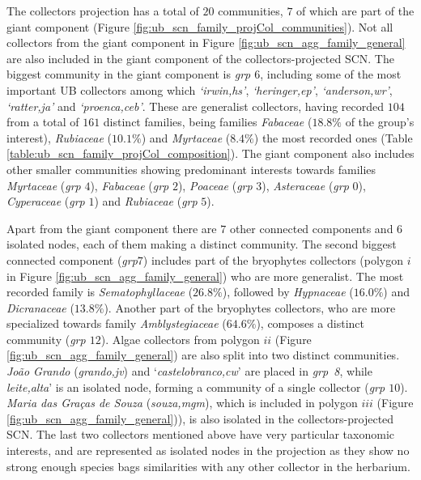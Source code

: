 The collectors projection has a total of $20$ communities, $7$ of which are part of the giant component (Figure \ref{fig:ub_scn_family_projCol_communities}). 
Not all collectors from the giant component in Figure \ref{fig:ub_scn_agg_family_general} are also included in the giant component of the collectors-projected SCN.
The biggest community in the giant component is \textit{grp $6$}, including some of the most important UB collectors among which \textit{`irwin,hs'}, \textit{`heringer,ep'}, \textit{`anderson,wr'}, \textit{`ratter,ja'} and \textit{`proenca,ceb'}.
These are generalist collectors, having recorded $104$ from a total of $161$ distinct families, being families \textit{Fabaceae} ($18.8\%$ of the group's interest), \textit{Rubiaceae} ($10.1\%$) and \textit{Myrtaceae} ($8.4\%$) the most recorded ones (Table \ref{table:ub_scn_family_projCol_composition}). 
%
The giant component also includes other smaller communities showing predominant interests towards families \textit{Myrtaceae} (\textit{grp} $4$), \textit{Fabaceae} (\textit{grp} $2$), \textit{Poaceae} (\textit{grp} $3$), \textit{Asteraceae} (\textit{grp} $0$), \textit{Cyperaceae} (\textit{grp} $1$) and \textit{Rubiaceae} (\textit{grp} $5$).

Apart from the giant component there are $7$ other connected components and $6$ isolated nodes, each of them making a distinct community.
The second biggest connected component (\textit{grp{$7$}}) includes part of the bryophytes collectors (polygon $i$ in Figure \ref{fig:ub_scn_agg_family_general}) who are more generalist.
The most recorded family is \textit{Sematophyllaceae} ($26.8\%$), followed by \textit{Hypnaceae} ($16.0\%$) and \textit{Dicranaceae} ($13.8\%$). 
Another part of the bryophytes collectors, who are more specialized towards family \textit{Amblystegiaceae} ($64.6\%$), composes a distinct community (\textit{grp $12$}).
%
Algae collectors from polygon $ii$ (Figure \ref{fig:ub_scn_agg_family_general}) are also split into two distinct communities.
\textit{João Grando} (\textit{grando,jv}) and `\textit{castelobranco,cw}' are placed in \textit{grp~8}, while \textit{leite,alta}' is an isolated node, forming a community of a single collector (\textit{grp $10$}).
\textit{Maria das Graças de Souza} (\textit{souza,mgm}), which is included in polygon $iii$ (Figure \ref{fig:ub_scn_agg_family_general})), is also isolated in the collectors-projected SCN.
The last two collectors mentioned above have very particular taxonomic interests, and are represented as isolated nodes in the projection as they show no strong enough species bags similarities with any other collector in the herbarium.

